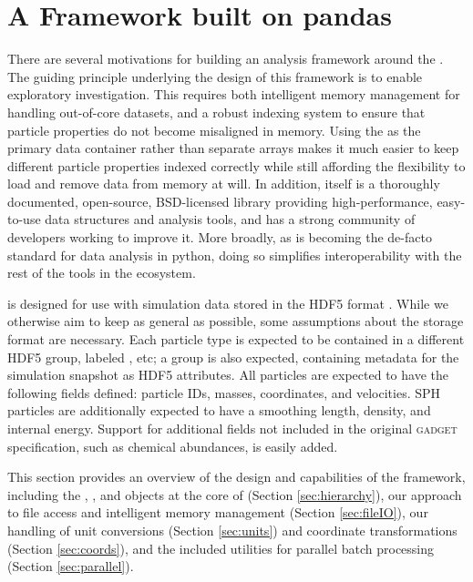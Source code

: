 \section{A Framework built on pandas}
\label{sec:framework}

There are several motivations for building an analysis framework around the . 
The guiding principle underlying the design of this framework is to enable exploratory investigation.
This requires both intelligent memory management for handling out-of-core datasets, and a robust indexing system to ensure that particle properties do not become misaligned in memory.
Using  the  as the primary data container rather than separate  arrays makes it much easier to keep different particle properties indexed correctly while still affording the flexibility to load and remove data from memory at will.
In addition,  itself is a thoroughly documented, open-source, BSD-licensed library providing high-performance, easy-to-use data structures and analysis tools, and has a strong community of developers working to improve it.  
More broadly, as  is becoming the de-facto standard for data analysis in python, doing so simplifies interoperability with the rest of the tools in the ecosystem.

 is designed for use with simulation data stored in the HDF5 format \citep{hdf5}.  
While we otherwise aim to keep  as general as possible, some assumptions about the storage format are necessary.
Each particle type is expected to be contained in a different HDF5 group, labeled , etc; a  group is also expected, containing metadata for the simulation snapshot as HDF5 attributes. 
All particles are expected to have the following fields defined: particle IDs, masses, coordinates, and velocities.  
SPH particles are additionally expected to have a smoothing length, density, and internal energy.  Support for additional fields not included in the original \textsc{gadget} specification, such as chemical abundances, is easily added.

This section provides an overview of the design and capabilities of the  framework, including the , , and  objects at the core of  (Section \ref{sec:hierarchy}), our approach to file access and intelligent memory management (Section \ref{sec:fileIO}), our handling of unit conversions (Section \ref{sec:units}) and coordinate transformations (Section \ref{sec:coords}), and the included utilities for parallel batch processing (Section \ref{sec:parallel}).
